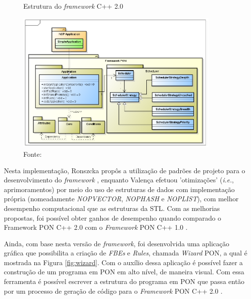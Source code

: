 \begin{figure}[!htb]
  \centering
  \caption{Estrutura do \textit{framework} C++ 2.0} \includegraphics[width=0.9\textwidth]{../figures/fw2_structure.png}
  \caption*{Fonte:
    }
  \label{fig:fw2_struct}
\end{figure}

Nesta implementação, Ronszcka propôs a utilização de padrões de projeto para o
desenvolvimento do \textit{framework} \cite{msc_Ronszcka_2012}, enquanto Valença
efetuou 'otimizações' (\textit{i.e.}, aprimoramentos) por meio do uso de
estruturas de dados com implementação própria (nomeadamente \textit{NOPVECTOR},
\textit{NOPHASH} e \textit{NOPLIST}), com melhor desempenho computacional que as
estruturas da STL. Com as melhorias propostas, foi possível obter ganhos de
desempenho quando comparado o Framework PON C++ 2.0 com o \textit{Framework} PON
C++ 1.0 \cite{msc_valenca_2012}. 

Ainda, com base nesta versão de \textit{framework}, foi desenvolvida uma aplicação
gráfica que possibilita a criação de \textit{FBEs} e \textit{Rules}, chamada
\textit{Wizard} PON, a qual é mostrada na Figura \ref{fig:wizard}. Com o auxílio
dessa aplicação é possível fazer a construção de um programa em PON em alto
nível, de maneira visual. Com essa ferramenta é possível escrever a estrutura do
programa em PON que passa então por um processo de geração de código para o
\textit{Framework} PON C++ 2.0 \cite{msc_valenca_2012}.

